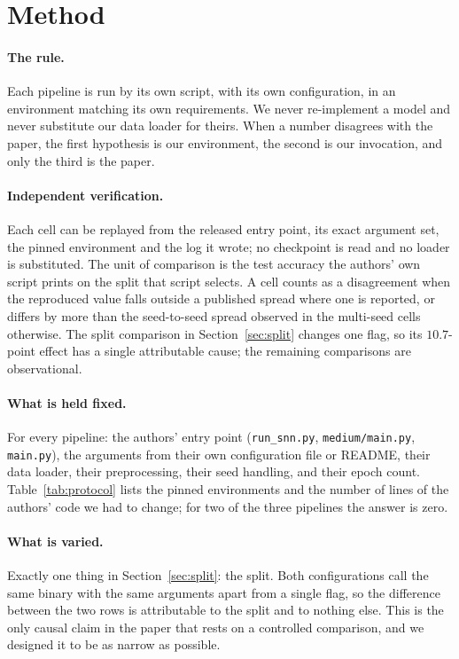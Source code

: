 \documentclass[10pt,twocolumn]{article}
\newcommand{\tabref}[1]{Table~\ref{#1}}
\newcommand{\secref}[1]{Section~\ref{#1}}
\begin{document}
\section{Method}
\label{sec:protocol}


\paragraph{The rule.} Each pipeline is run by its own script, with its own configuration, in an
environment matching its own requirements. We never re-implement a model and never substitute our
data loader for theirs. When a number disagrees with the paper, the first hypothesis is our
environment, the second is our invocation, and only the third is the paper.

\paragraph{Independent verification.} Each cell can be replayed from the released entry point, its
exact argument set, the pinned environment and the log it wrote; no checkpoint is read and no loader
is substituted. The unit of comparison is the test accuracy the authors' own script prints on the
split that script selects. A cell counts as a disagreement when the reproduced value falls outside a
published spread where one is reported, or differs by more than the seed-to-seed spread observed in
the multi-seed cells otherwise. The split comparison in \secref{sec:split} changes one flag, so its
$10.7$-point effect has a single attributable cause; the remaining comparisons are observational.

\paragraph{What is held fixed.} For every pipeline: the authors' entry point (\texttt{run\_snn.py},
\texttt{medium/main.py}, \texttt{main.py}), the arguments from their own configuration file or README,
their data loader, their preprocessing, their seed handling, and their epoch count. \tabref{tab:protocol}
lists the pinned environments and the number of lines of the authors' code we had to change; for two
of the three pipelines the answer is zero.

\paragraph{What is varied.} Exactly one thing in \secref{sec:split}: the split. Both configurations
call the same binary with the same arguments apart from a single flag, so the difference between the
two rows is attributable to the split and to nothing else. This is the only causal claim in the paper
that rests on a controlled comparison, and we designed it to be as narrow as possible.
\end{document}

